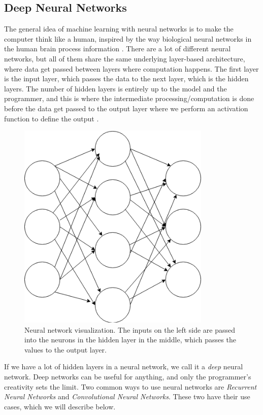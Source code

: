 \subsection{Deep Neural Networks}

The general idea of machine learning with neural networks is to make the computer think like a human, inspired by the way biological neural networks in the human 
brain process information \cite{deep_learning}. There are a lot of different neural networks, but all of them share the same underlying layer-based architecture, 
where data get passed between layers where computation happens. The first layer is the input layer, which passes the data to the next layer, which is the hidden layers. 
The number of hidden layers is entirely up to the model and the programmer, and this is where the intermediate processing/computation is done before the data get passed 
to the output layer where we perform an activation function to define the output \cite{deep_learning}.

\begin{figure}[h]
    \begin{center}
        \includegraphics[height=10cm]{neural_net.png}
        \caption{Neural network visualization. The inputs on the left side are passed into the neurons in the hidden layer in the middle, which passes the values to the output layer.}
        \label{figure:neural_net}
    \end{center}
\end{figure}

If we have a lot of hidden layers in a neural network, we call it a \textit{deep} neural network. Deep networks can be useful for anything, and only the programmer's creativity sets the limit. Two common ways to use neural networks are \textit{Recurrent Neural Networks} and \textit{Convolutional Neural Networks}. These two have their use cases, which we will describe below.

